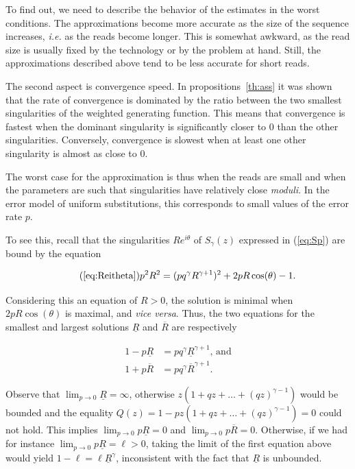 \documentclass{article}
\begin{document}
To find out, we need to describe the behavior of the estimates in the
worst conditions. The approximations become more accurate as the size of
the sequence increases, \textit{i.e.} as the reads become longer. This is
somewhat awkward, as the read size is usually fixed by the technology or
by the problem at hand. Still, the approximations described above tend to
be less accurate for short reads.

The second aspect is convergence speed. In propositions~\ref{th:ass} it
was shown that the rate of convergence is dominated by the ratio between
the two smallest singularities of the weighted generating function. This
means that convergence is fastest when the dominant singularity is
significantly closer to $0$ than the other singularities. Conversely,
convergence is slowest when at least one other singularity is almost as
close to $0$.

The worst case for the approximation is thus when the reads are small and
when the parameters are such that singularities have relatively close
\textit{moduli}. In the error model of uniform substitutions, this
corresponds to small values of the error rate $p$.

To see this, recall that the singularities $Re^{i\theta}$ of $S_\gamma(z)$
expressed in (\ref{eq:Sp}) are bound by the equation

\begin{equation}
\tag{\ref{eq:Reitheta}}
p^2R^2 = (pq^\gamma R^{\gamma+1})^2 + 2pR \cos(\theta) -1.
\end{equation}

Considering this an equation of $R > 0$, the solution is minimal when
$2pR\cos(\theta)$ is maximal, and \textit{vice versa}. Thus, the two
equations for the smallest and largest solutions $\underline{R}$ and
$\overline{R}$ are respectively

\begin{align*}
1-p\underline{R} &= pq^\gamma \underline{R}^{\gamma+1}\text{, and} \\
1+p\overline{R} &= pq^\gamma \overline{R}^{\gamma+1}.
\end{align*}

Observe that $\lim_{p\rightarrow 0}\underline{R} = \infty$, otherwise
$z(1+qz+\ldots+(qz)^{\gamma-1})$ would be bounded and the equality $Q(z) =
1-pz(1+qz+\ldots+(qz)^{\gamma-1}) = 0$ could not hold. This implies
$\lim_{p\rightarrow 0}p\underline{R} = 0$ and $\lim_{p\rightarrow
0}p\overline{R} = 0$. Otherwise, if we had for instance
$\lim_{p\rightarrow 0}p\underline{R} = \ell > 0$, taking the limit of the
first equation above would yield $1-\ell = \ell \underline{R}^\gamma$,
inconsistent with the fact that $\underline{R}$ is unbounded.
\end{document}
